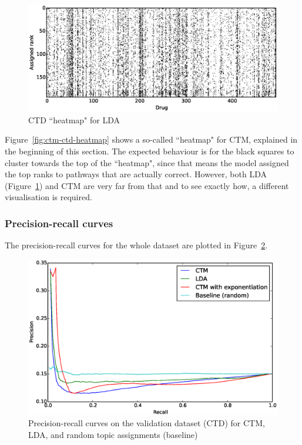 \documentclass[12pt,a4paper,twoside,openright]{report}
\begin{document}
\begin{figure}[!htb]
\includegraphics[width=\textwidth]{lda-ctd-heatmap.eps}
\caption{CTD ``heatmap" for LDA}
\label{fig:lda-ctd-heatmap}
\end{figure}

Figure~\ref{fig:ctm-ctd-heatmap} shows a so-called ``heatmap" for CTM, explained in the beginning of this section. The expected behaviour is for the black squares to cluster towards the top of the ``heatmap", since that means the model assigned the top ranks to pathways that are actually correct. However, both LDA (Figure~\ref{fig:lda-ctd-heatmap}) and CTM are very far from that and to see exactly how, a different visualisation is required.

\subsubsection{Precision-recall curves}

The precision-recall curves for the whole dataset are plotted in Figure~\ref{fig:ctd-pr-curves}.

\begin{figure}[!htb]
\includegraphics[width=\textwidth]{ctd-pr-curves.eps}
\caption{Precision-recall curves on the validation dataset (CTD) for CTM, LDA, and random topic assignments (baseline)}
\label{fig:ctd-pr-curves}
\end{figure}
\end{document}
